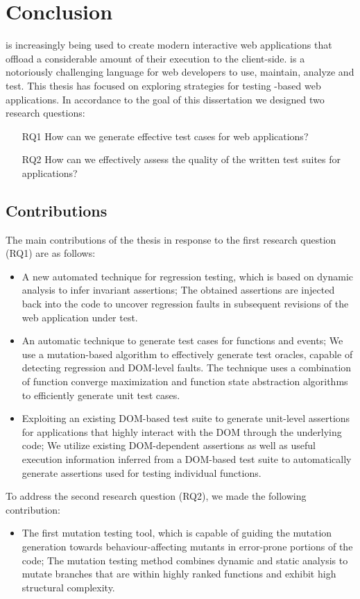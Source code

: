 \chapter{Conclusion} \label{Chap:conc}
\javascript is increasingly being used to create modern interactive web applications that offload a considerable amount of their execution to the client-side. \javascript is a notoriously challenging language for web developers to use, maintain, analyze and test. This thesis has focused on exploring strategies for testing \javascript-based web applications. In accordance to the goal of this dissertation we designed two research questions:
\begin{itemize}
\item [RQ1] How can we generate effective test cases for \javascript web applications?
\item [RQ2] How can we effectively assess the quality of the written test suites for \javascript applications?
\end{itemize}
\section{Contributions}
The main contributions of the thesis in response to the first research question (RQ1) are as follows: 
\begin{itemize}
\item A new automated technique for \javascript regression testing, which is based on dynamic analysis to infer invariant assertions; The obtained assertions are injected back into the \javascript code to uncover regression faults in subsequent revisions of the web application under test. 
\item An automatic technique to generate test cases for \javascript functions and events; We use a mutation-based algorithm to effectively generate test oracles, capable of detecting regression \javascript and DOM-level faults. The technique uses a combination of function converge maximization and function state abstraction algorithms to efficiently generate unit test cases.
\item Exploiting an existing DOM-based test suite to generate unit-level assertions for applications that highly interact with the DOM through the underlying \javascript code; We utilize
existing DOM-dependent assertions as well as useful execution information inferred from a DOM-based test suite to automatically generate assertions used for testing individual \javascript functions.
\end{itemize}
To address the second research question (RQ2), we made the following contribution:
\begin{itemize}
\item The first \javascript mutation testing tool, which is capable of guiding the mutation generation towards behaviour-affecting mutants in error-prone portions of the code; The mutation testing method combines dynamic and static analysis to mutate branches that are within highly ranked functions and exhibit high structural complexity.
\end{itemize}
